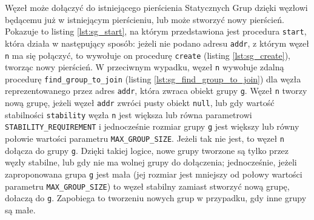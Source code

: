 \documentclass[12pt, twoside, openany]{report}
\begin{document}
Węzeł może dołączyć do istniejącego pierścienia Statycznych Grup dzięki węzłowi będącemu już w istniejącym pierścieniu, lub może stworzyć nowy pierścień. Pokazuje to listing \ref{lst:sg_start}, na którym przedstawiona jest procedura \texttt{start}, która działa w następujący sposób: jeżeli nie podano adresu \texttt{addr}, z którym węzeł \texttt{n} ma się połączyć, to wywołuje on procedurę \texttt{create} (listing \ref{lst:sg_create}), tworząc nowy pierścień. W przeciwnym wypadku, węzeł \texttt{n} wywołuje zdalną procedurę \texttt{find\_group\_to\_join} (listing \ref{lst:sg_find_group_to_join}) dla węzła reprezentowanego przez adres \texttt{addr}, która zwraca obiekt grupy \texttt{g}. Węzeł \texttt{n} tworzy nową grupę, jeżeli węzeł \texttt{addr} zwróci pusty obiekt \texttt{null}, lub gdy wartość stabilności \texttt{stability} węzła \texttt{n} jest większa lub równa parametrowi \texttt{STABILITY\_REQUIREMENT} i jednocześnie rozmiar grupy \texttt{g} jest większy lub równy połowie wartości parametru \texttt{MAX\_GROUP\_SIZE}. Jeżeli tak nie jest, to węzeł \texttt{n} dołącza do grupy \texttt{g}. Dzięki takiej logice, nowe grupy tworzone są tylko przez węzły stabilne, lub gdy nie ma wolnej grupy do dołączenia; jednocześnie, jeżeli zaproponowana grupa \texttt{g} jest mała (jej rozmiar jest mniejszy od połowy wartości parametru \texttt{MAX\_GROUP\_SIZE}) to węzeł stabilny zamiast stworzyć nową grupę, dołaczą do \texttt{g}. Zapobiega to tworzeniu nowych grup w przypadku, gdy inne grupy są małe.










\end{document}
